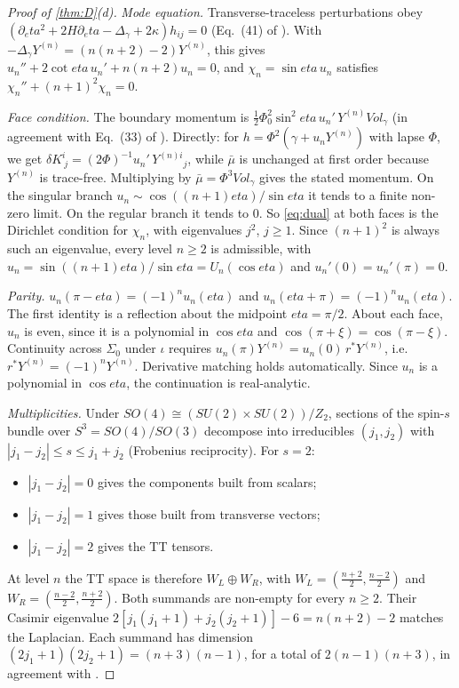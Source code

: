\documentclass[11pt]{article}
\theoremstyle{canonmath}
\theoremstyle{canonpostulate}
\theoremstyle{canonproposition}
\theoremstyle{canonmath}
\theoremstyle{canonproposition}
\providecommand{\Ztwo}{\mathbb{Z}_2}
\def\mathrm#1{#1}%
\def\mathbb#1{#1}%
\def\mathcal#1{#1}%
\def\eta{eta}%
\begin{document}
\begin{proof}[Proof of \cref{thm:D}(d)]
\emph{Mode equation.} Transverse-traceless perturbations obey $(\partial_\eta^2 + 2\mathcal{H}\partial_\eta - \Delta_\gamma + 2\kappa)h_{ij} = 0$ (Eq.~(41) of \cite{TBT2026}). With $-\Delta_\gamma Y^{(n)} = (n(n+2)-2)Y^{(n)}$, this gives $u_n'' + 2\cot\eta\,u_n' + n(n+2)u_n = 0$, and $\chi_n = \sin\eta\,u_n$ satisfies $\chi_n'' + (n+1)^2\chi_n = 0$.

\emph{Face condition.} The boundary momentum is $\tfrac12\Phi_0^2\sin^2\eta\,u_n'\,Y^{(n)}\mathrm{Vol}_\gamma$ (in agreement with Eq.~(33) of \cite{TBT2026}). Directly: for $h = \Phi^2(\gamma + u_nY^{(n)})$ with lapse $\Phi$, we get $\delta K^i_{\ j} = (2\Phi)^{-1}u_n'\,Y^{(n)i}{}_j$, while $\bar\mu$ is unchanged at first order because $Y^{(n)}$ is trace-free. Multiplying by $\bar\mu = \Phi^3\mathrm{Vol}_\gamma$ gives the stated momentum. On the singular branch $u_n\sim\cos((n+1)\eta)/\sin\eta$ it tends to a finite non-zero limit. On the regular branch it tends to $0$. So \eqref{eq:dual} at both faces is the Dirichlet condition for $\chi_n$, with eigenvalues $j^2$, $j\ge1$. Since $(n+1)^2$ is always such an eigenvalue, every level $n\ge2$ is admissible, with $u_n = \sin((n+1)\eta)/\sin\eta = U_n(\cos\eta)$ and $u_n'(0) = u_n'(\pi) = 0$.

\emph{Parity.} $u_n(\pi-\eta) = (-1)^nu_n(\eta)$ and $u_n(\eta+\pi) = (-1)^nu_n(\eta)$. The first identity is a reflection about the midpoint $\eta = \pi/2$. About each face, $u_n$ is even, since it is a polynomial in $\cos\eta$ and $\cos(\pi+\xi) = \cos(\pi-\xi)$. Continuity across $\Sigma_0$ under $\iota$ requires $u_n(\pi)Y^{(n)} = u_n(0)\,r^*Y^{(n)}$, i.e.\ $r^*Y^{(n)} = (-1)^nY^{(n)}$. Derivative matching holds automatically. Since $u_n$ is a polynomial in $\cos\eta$, the continuation is real-analytic.

\emph{Multiplicities.} Under $SO(4)\cong(SU(2)\times SU(2))/\Ztwo$, sections of the spin-$s$ bundle over $S^3 = SO(4)/SO(3)$ decompose into irreducibles $(j_1,j_2)$ with $|j_1-j_2|\le s\le j_1+j_2$ (Frobenius reciprocity). For $s = 2$:
\begin{itemize}
\item $|j_1-j_2| = 0$ gives the components built from scalars;
\item $|j_1-j_2| = 1$ gives those built from transverse vectors;
\item $|j_1-j_2| = 2$ gives the TT tensors.
\end{itemize}
At level $n$ the TT space is therefore $W_L\oplus W_R$, with $W_L = (\tfrac{n+2}2,\tfrac{n-2}2)$ and $W_R = (\tfrac{n-2}2,\tfrac{n+2}2)$. Both summands are non-empty for every $n\ge2$. Their Casimir eigenvalue $2[j_1(j_1+1)+j_2(j_2+1)]-6 = n(n+2)-2$ matches the Laplacian. Each summand has dimension $(2j_1+1)(2j_2+1) = (n+3)(n-1)$, for a total of $2(n-1)(n+3)$, in agreement with \cite{RubinOrdonez1984}.


\end{proof}
\end{document}
